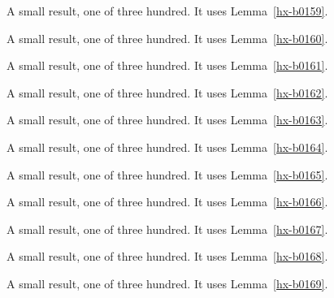 \begin{lemma}[Bulk 160]\label{hx-b0160}
A small result, one of three hundred. It uses Lemma~\ref{hx-b0159}.
\end{lemma}

\begin{lemma}[Bulk 161]\label{hx-b0161}
A small result, one of three hundred. It uses Lemma~\ref{hx-b0160}.
\end{lemma}

\begin{lemma}[Bulk 162]\label{hx-b0162}
A small result, one of three hundred. It uses Lemma~\ref{hx-b0161}.
\end{lemma}

\begin{lemma}[Bulk 163]\label{hx-b0163}
A small result, one of three hundred. It uses Lemma~\ref{hx-b0162}.
\end{lemma}

\begin{lemma}[Bulk 164]\label{hx-b0164}
A small result, one of three hundred. It uses Lemma~\ref{hx-b0163}.
\end{lemma}

\begin{lemma}[Bulk 165]\label{hx-b0165}
A small result, one of three hundred. It uses Lemma~\ref{hx-b0164}.
\end{lemma}

\begin{lemma}[Bulk 166]\label{hx-b0166}
A small result, one of three hundred. It uses Lemma~\ref{hx-b0165}.
\end{lemma}

\begin{lemma}[Bulk 167]\label{hx-b0167}
A small result, one of three hundred. It uses Lemma~\ref{hx-b0166}.
\end{lemma}

\begin{lemma}[Bulk 168]\label{hx-b0168}
A small result, one of three hundred. It uses Lemma~\ref{hx-b0167}.
\end{lemma}

\begin{lemma}[Bulk 169]\label{hx-b0169}
A small result, one of three hundred. It uses Lemma~\ref{hx-b0168}.
\end{lemma}

\begin{lemma}[Bulk 170]\label{hx-b0170}
A small result, one of three hundred. It uses Lemma~\ref{hx-b0169}.
\end{lemma}

